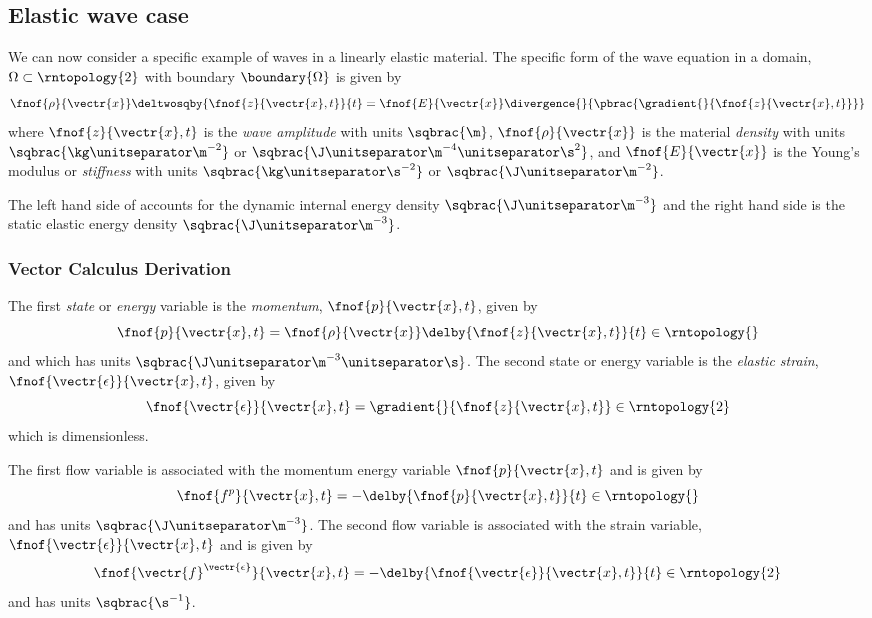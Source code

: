 \subsection{Elastic wave case}

We can now consider a specific example of waves in a linearly elastic
material. The specific form of the wave equation in a domain,
$\Omega\subset\rntopology{2}$ with boundary $\boundary{\Omega}$ is given by
\begin{equation}
  \fnof{\rho}{\vectr{x}}\deltwosqby{\fnof{z}{\vectr{x},t}}{t}=\fnof{E}{\vectr{x}}\divergence{}{\pbrac{\gradient{}{\fnof{z}{\vectr{x},t}}}}
  \label{eqn:2DElasticWaveEquation}
\end{equation}
where $\fnof{z}{\vectr{x},t}$ is the \emph{wave amplitude} with units
$\sqbrac{\m}$, $\fnof{\rho}{\vectr{x}}$ is the material \emph{density}
with units $\sqbrac{\kg\unitseparator\m^{-2}}$ or
$\sqbrac{\J\unitseparator\m^{-4}\unitseparator\s^{2}}$, and
$\fnof{E}{\vectr{x}}$ is the Young's modulus
or \emph{stiffness} with units
$\sqbrac{\kg\unitseparator\s^{-2}}$ or
$\sqbrac{\J\unitseparator\m^{-2}}$.

The left hand side of  accounts for
the dynamic internal energy density $\sqbrac{\J\unitseparator\m^{-3}}$
and the right hand side is the static elastic energy density
$\sqbrac{\J\unitseparator\m^{-3}}$.

\subsubsection{Vector Calculus Derivation}

The first \emph{state} or \emph{energy} variable is the \emph{momentum}, $\fnof{p}{\vectr{x},t}$, given by
\begin{equation}
  \fnof{p}{\vectr{x},t}=\fnof{\rho}{\vectr{x}}\delby{\fnof{z}{\vectr{x},t}}{t}\in\rntopology{}
\end{equation}
and which has units $\sqbrac{\J\unitseparator\m^{-3}\unitseparator\s}$. The second state or energy variable is the \emph{elastic strain}, $\fnof{\vectr{\epsilon}}{\vectr{x},t}$, given by
\begin{equation}
    \fnof{\vectr{\epsilon}}{\vectr{x},t}=\gradient{}{\fnof{z}{\vectr{x},t}}\in\rntopology{2}
\end{equation}
which is dimensionless.

The first flow variable is associated with the momentum energy variable $\fnof{p}{\vectr{x},t}$ and is given by
\begin{equation}
  \fnof{f^{p}}{\vectr{x},t}=-\delby{\fnof{p}{\vectr{x},t}}{t}\in\rntopology{}
\end{equation}
and has units $\sqbrac{\J\unitseparator\m^{-3}}$. The second flow
variable is associated with the strain variable,
$\fnof{\vectr{\epsilon}}{\vectr{x},t}$ and is given by
\begin{equation}
  \fnof{\vectr{f}^{\vectr{\epsilon}}}{\vectr{x},t}=-\delby{\fnof{\vectr{\epsilon}}{\vectr{x},t}}{t}\in\rntopology{2}
\end{equation}
and has units $\sqbrac{\s^{-1}}$.

